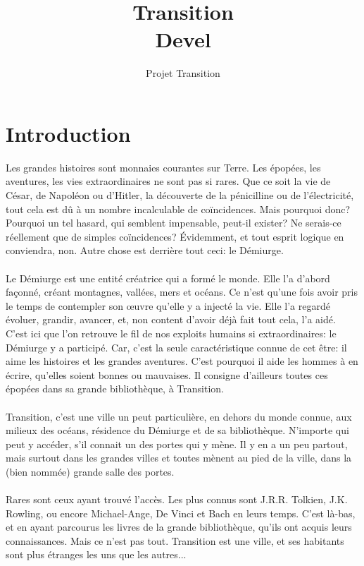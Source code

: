 \documentclass{book}
\title{Transition \\ Devel}
\author{Projet Transition}
\date{\oldstylenums{\insertdate}}
\begin{document}
\maketitle
\setcounter{tocdepth}{1} %
\renewcommand{\contentsname}{Sommaire} 
\tableofcontents

\newpage
\section*{Introduction}
Les grandes histoires sont monnaies courantes sur Terre. Les épopées, les aventures, les vies extraordinaires ne sont pas si rares. Que ce soit la  vie de César, de Napoléon ou d'Hitler, la découverte de la pénicilline ou de l’électricité, tout cela est dû à un nombre incalculable de coïncidences. Mais pourquoi donc? Pourquoi un tel hasard, qui semblent impensable, peut-il exister? Ne serais-ce réellement que de simples coïncidences?
Évidemment, et tout esprit logique en conviendra, non. Autre chose est derrière tout ceci: le Démiurge.
\\
\\
Le Démiurge est une entité créatrice qui a formé le monde. Elle l'a d'abord façonné, créant montagnes, vallées, mers et océans. Ce n'est qu'une fois avoir pris le temps de contempler son œuvre qu'elle y a injecté la vie. Elle l'a regardé évoluer, grandir, avancer, et, non content d'avoir déjà fait tout cela, l'a aidé.
\\
C'est ici que l'on retrouve le fil de nos exploits humains si extraordinaires: le Démiurge y a participé. Car, c'est la seule caractéristique connue de cet être: il aime les histoires et les grandes aventures. C'est pourquoi il aide les hommes à en écrire, qu'elles soient bonnes ou mauvaises.
Il consigne d'ailleurs toutes ces épopées dans sa grande bibliothèque, à Transition.
\\
\\
Transition, c'est une ville un peut particulière, en dehors du monde connue, aux milieux des océans, résidence du Démiurge et de sa bibliothèque. N'importe qui peut y accéder, s'il connait un des portes qui y mène. Il y en a un peu partout, mais surtout dans les grandes villes et toutes mènent au pied de la ville, dans la (bien nommée) grande salle des portes.
\\
\\
Rares sont ceux ayant trouvé l'accès. Les plus connus sont J.R.R. Tolkien, J.K. Rowling, ou encore Michael-Ange, De Vinci et Bach en leurs temps. C'est là-bas, et en ayant parcourus les livres de la grande bibliothèque, qu'ils ont acquis leurs connaissances. Mais ce n'est pas tout. Transition est une ville, et ses habitants sont plus étranges les uns que les autres...
\end{document}
